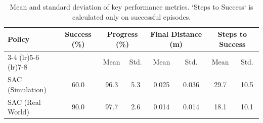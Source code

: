 
\begin{table}[!htbp]
\caption{Mean and standard deviation of key performance metrics. `Steps to Success` is calculated only on successful episodes.}
\label{tab:performance_summary}
\begin{tabular}{l c cc cc cc}
\toprule
\textbf{Policy} & \textbf{Success (\%)} & \multicolumn{2}{c}{\textbf{Progress (\%)}} & \multicolumn{2}{c}{\textbf{Final Distance (m)}} & \multicolumn{2}{c}{\textbf{Steps to Success}} \\
\cmidrule(lr){3-4} \cmidrule(lr){5-6} \cmidrule(lr){7-8}
               &                       & Mean & Std. & Mean & Std. & Mean & Std. \\
\midrule
SAC (Simulation) & 60.0 & 96.3 & 5.3 & 0.025 & 0.036 & 29.7 & 10.5 \\
SAC (Real World) & 90.0 & 97.7 & 2.6 & 0.014 & 0.014 & 18.1 & 10.1 \\
\bottomrule
\end{tabular}
\end{table}